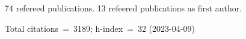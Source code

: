 74 refereed publications. 13 refeered publications as first author.

Total citations~=~3189; h-index~=~32 (2023-04-09)